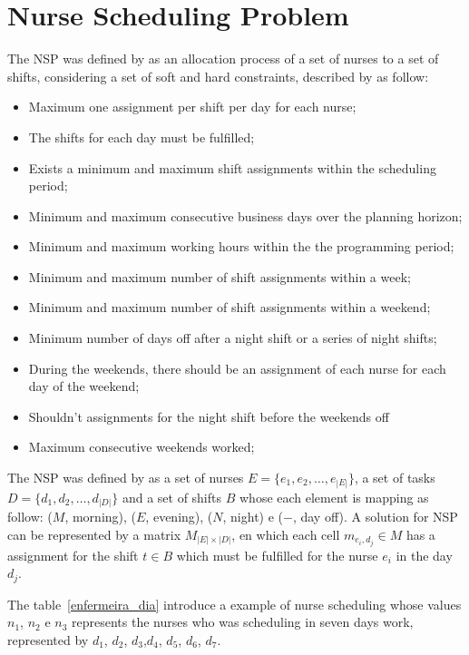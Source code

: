 
\section{Nurse Scheduling Problem}

The \ac{NSP} was defined by  as an allocation process of a set of nurses to a set of shifts, considering a set of soft and hard constraints, described by  as follow:

\begin{itemize}
    \item Maximum one assignment per shift per day for each nurse;
    \item The shifts for each day must be fulfilled;
    \item Exists a minimum and maximum shift assignments within the scheduling period;
    \item Minimum and maximum consecutive business days over the planning horizon;
    \item Minimum and maximum working hours within the the programming period;
    \item Minimum and maximum number of shift assignments within a week;
    \item Minimum and maximum number of shift assignments within a weekend;
    \item Minimum number of days off after a night shift or a series of night shifts;
    \item During the weekends, there should be an assignment of each nurse for each day of the weekend;
    \item Shouldn't assignments for the night shift before the weekends off
    \item Maximum consecutive weekends worked;
\end{itemize}    

The \ac{NSP} was defined by  as a set of nurses $E = \{e_1, e_2, \ldots, e_{|E|}\}$, a set of tasks $D = \{d_1, d_2, \ldots, d_{|D|}\}$ and a set of shifts $B$ whose each element is mapping as follow: ($M$, morning), ($E$, evening), ($N$, night) e ($-$, day off). A solution for \ac{NSP} can be represented by a matrix $M_{|E|\times |D|}$, en which each cell $m_{e_i,d_j} \in M$ has a assignment for the shift $t\in B$ which must be fulfilled for the nurse $e_i$ in the day $d_j$.

The table~\ref{enfermeira_dia} introduce a example of nurse scheduling whose values $n_1$, $n_2$ e $n_3$ represents the nurses who was scheduling in seven days work, represented by $d_1$, $d_2$, $d_3$,$d_4$, $d_5$, $d_6$, $d_7$.     

